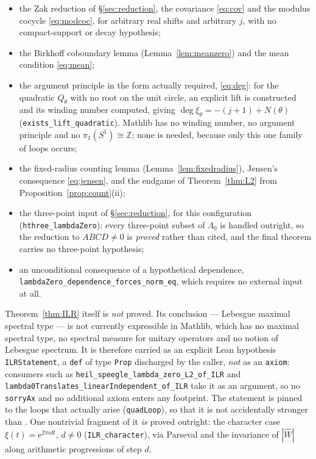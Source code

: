 \documentclass[11pt]{amsart}
\theoremstyle{remark}
\newcommand{\Z}{\mathbb Z}
\newcommand{\e}{\mathrm e}
\DeclareMathOperator{\dg}{deg}
\begin{document}
\begin{itemize}
\item the Zak reduction of \S\ref{sec:reduction}, the covariance \eqref{eq:cov} and the
modulus cocycle \eqref{eq:modcoc}, for arbitrary real shifts and arbitrary $j$, with no
compact-support or decay hypothesis;
\item the Birkhoff coboundary lemma (Lemma~\ref{lem:meanzero}) and the mean condition
\eqref{eq:mean};
\item the argument principle in the form actually required, \eqref{eq:deg}: for the quadratic
$Q_\theta$ with no root on the unit circle, an explicit lift is constructed and its winding
number computed, giving $\dg\xi_\theta=-(j+1)+N(\theta)$
(\texttt{exists\_lift\_quadratic}). Mathlib has no winding number, no argument principle and
no $\pi_1(S^1)\cong\Z$; none is needed, because only this one family of loops occurs;
\item the fixed-radius counting lemma (Lemma~\ref{lem:fixedradius}), Jensen's consequence
\eqref{eq:jensen}, and the endgame of Theorem~\ref{thm:L2} from
Proposition~\ref{prop:count}(ii);
\item the three-point input of \S\ref{sec:reduction}, for this configuration
(\texttt{hthree\_lambdaZero}): every three-point subset of $\Lambda_0$ is handled outright, so
the reduction to $ABCD\neq0$ is \emph{proved} rather than cited, and the final theorem carries
no three-point hypothesis;
\item an unconditional consequence of a hypothetical dependence,
\texttt{lambdaZero\_dependence\_forces\_norm\_eq}, which requires no external input at all.
\end{itemize}

Theorem~\ref{thm:ILR} itself is \emph{not} proved. Its conclusion --- Lebesgue maximal
spectral type --- is not currently expressible in Mathlib, which has no maximal spectral type,
no spectral measure for unitary operators and no notion of Lebesgue spectrum. It is therefore
carried as an explicit Lean hypothesis \texttt{ILRStatement}, a \texttt{def} of type
\texttt{Prop} discharged by the caller, \emph{not} as an \texttt{axiom}: consumers such as
\texttt{heil\_speegle\_lambda\_zero\_L2\_of\_ILR} and
\texttt{lambda0Translates\_linearIndependent\_of\_ILR} take it as an argument, so no
\texttt{sorryAx} and no additional axiom enters any footprint. The statement is pinned to the
loops that actually arise (\texttt{quadLoop}), so that it is not accidentally stronger than
\cite{ILR}. One nontrivial fragment of it \emph{is} proved outright: the character case
$\xi(t)=\e^{2\pi idt}$, $d\neq0$ (\texttt{ILR\_character}), via Parseval and the invariance of
$|\widehat W|$ along arithmetic progressions of step $d$.
\end{document}
